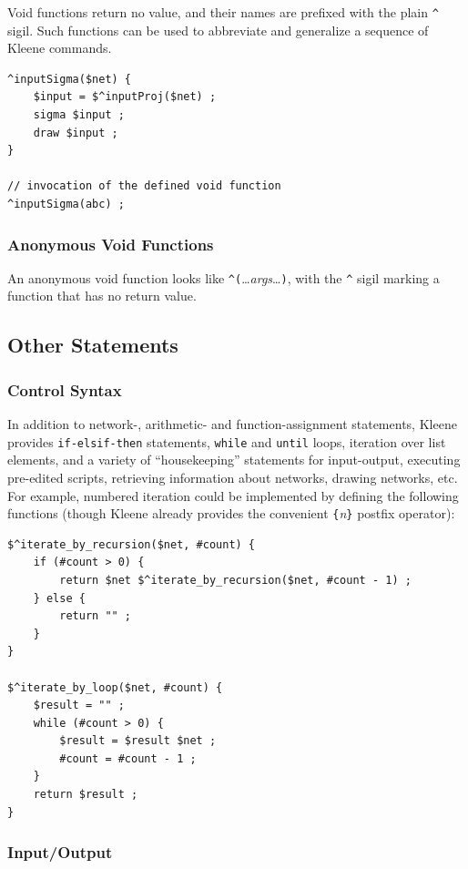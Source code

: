 \documentclass[letterpaper,12pt]{article}
\newcommand{\Kleene}{Kleene\xspace}
\begin{document}
Void functions return no value, and their names are
prefixed with the plain \verb!^!
sigil.  Such functions can be used to abbreviate and generalize a
sequence of Kleene commands.

\begin{Verbatim}[fontsize=\small]
^inputSigma($net) {
	$input = $^inputProj($net) ;
	sigma $input ;
	draw $input ;
}

// invocation of the defined void function
^inputSigma(abc) ;
\end{Verbatim}

\subsubsection{Anonymous Void Functions}

An anonymous void function looks like
\verb!^(!\ldots\emph{args}\ldots\verb!)!, with the \verb!^! sigil
marking a function that has no return value. 

\subsection{Other Statements}

\subsubsection{Control Syntax}

In addition to network-, arithmetic- and function-assignment statements,
\Kleene{} provides \verb!if-elsif-then! statements, \verb!while!  and
\verb!until!  loops, iteration over list elements, and a variety of
``housekeeping'' statements for input-output, executing pre-edited
scripts, retrieving information about networks, drawing networks, etc.
For example, numbered iteration could be implemented by defining the
following functions (though \Kleene{} already provides the convenient
\verb!{!\emph{n}\verb!}! postfix operator):

\begin{Verbatim}[fontsize=\small]
$^iterate_by_recursion($net, #count) {
    if (#count > 0) {
        return $net $^iterate_by_recursion($net, #count - 1) ;
    } else {
        return "" ;
    }
}

$^iterate_by_loop($net, #count) {
    $result = "" ;
    while (#count > 0) {
        $result = $result $net ;
        #count = #count - 1 ;
    }
    return $result ;
}
\end{Verbatim}

\subsubsection{Input/Output}
\end{document}
